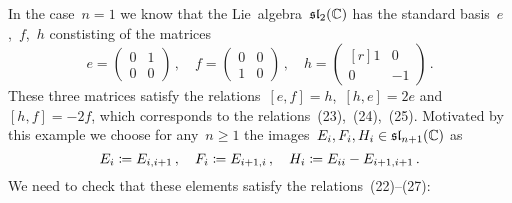 In the case~$n = 1$ we know that the Lie~algebra~$\mathfrak{sl}_2(\mathbb{C})$ has the standard basis~$e$,~$f$,~$h$ constisting of the matrices
\[
  e
  =
  \begin{pmatrix}
    0 & 1 \\
    0 & 0
  \end{pmatrix} \,,
  \quad
  f
  =
  \begin{pmatrix}
    0 & 0 \\
    1 & 0
  \end{pmatrix} \,,
  \quad
  h
  =
  \begin{pmatrix*}[r]
    1 &  0  \\
    0 & -1
  \end{pmatrix*}  \,.
\]
These three matrices satisfy the relations~$[e,f] = h$,~$[h,e] = 2e$ and~$[h,f] = -2f$, which corresponds to the relations~(23),~(24),~(25).
Motivated by this example we choose for any~$n \geq 1$ the images~$E_i, F_i, H_i \in \mathfrak{sl}_{n+1}(\mathbb{C})$ as
\[
  E_i
  \coloneqq
  E_{i,i+1} \,,
  \quad
  F_i
  \coloneqq
  E_{i+1,i} \,,
  \quad
  H_i
  \coloneqq
  E_{ii} - E_{i+1,i+1}  \,.
\]
We need to check that these elements satisfy the relations~(22)--(27):
